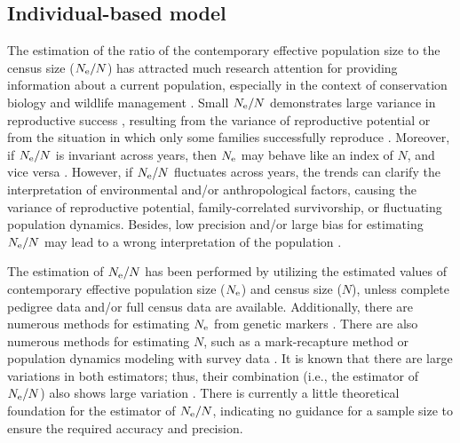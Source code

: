 \documentclass[12pt, English]{article}
\begin{document}
\begin{spacing}{1.9}
\subsection{Individual-based model}










The estimation of the ratio of the contemporary effective population size to the census size ($N_{\rm e}/N$) has attracted much research attention for providing information about a current population, especially in the context of conservation biology and wildlife management \cite[]{Palstra_2012,FRANKHAM201456}. Small $N_{\rm e}/N$ demonstrates large variance in reproductive success \cite[]{Wang:2016aa, JFB:JFB13143, Akita_2019}, resulting from the variance of reproductive potential \cite[e.g., the big old fat fecund female fish hypothesis;][]{Hixon_2014} or from the situation in which only some families successfully reproduce \cite[referred to as the ``Sweepstakes reproductive success'' hypothesis,][]{hedgecock2011sweepstakes}. Moreover, if $N_{\rm e}/N$ is invariant across years, then $N_{\rm e}$ may behave like an index of $N$, and vice versa \cite[]{luikart2010estimation}. However, if $N_{\rm e}/N$ fluctuates across years, the trends can clarify the interpretation of environmental and/or anthropological factors, causing the variance of reproductive potential, family-correlated survivorship, or fluctuating population dynamics. Besides, low precision and/or large bias for estimating $N_{\rm e}/N$ may lead to a wrong interpretation of the population \cite[]{Tallmon:2012aa}.

The estimation of $N_{\rm e}/N$ has been performed by utilizing the estimated values of contemporary effective population size ($N_{\rm e}$) and census size ($N$), unless complete pedigree data and/or full census data are available. Additionally, there are numerous methods for estimating $N_{\rm e}$ from genetic markers \cite[][and the references contained therein]{Wang:2016aa}. There are also numerous methods for estimating $N$, such as a mark-recapture method or population dynamics modeling with survey data \cite[e.g.,][]{seber1982estimation,quinn1999quantitative,kery2011bayesian,methot2013stock}. It is known that there are large variations in both estimators; thus, their combination (i.e., the estimator of $N_{\rm e}/N$) also shows large variation \cite[]{Palstra_2012,Marandel_2018}. There is currently a little theoretical foundation for the estimator of $N_{\rm e}/N$, indicating no guidance for a sample size to ensure the required accuracy and precision. 


\end{spacing}
\end{document}
